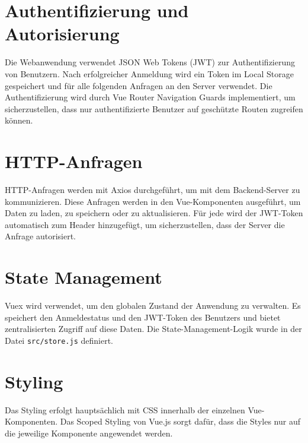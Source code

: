 \section{Authentifizierung und Autorisierung}
Die Webanwendung verwendet JSON Web Tokens (JWT) zur Authentifizierung von Benutzern. Nach erfolgreicher Anmeldung wird ein Token im Local Storage gespeichert und für alle folgenden Anfragen an den Server verwendet. Die Authentifizierung wird durch Vue Router Navigation Guards implementiert, um sicherzustellen, dass nur authentifizierte Benutzer auf geschützte Routen zugreifen können.

\section {HTTP-Anfragen}
HTTP-Anfragen werden mit Axios durchgeführt, um mit dem Backend-Server zu kommunizieren. Diese Anfragen werden in den Vue-Komponenten ausgeführt, um Daten zu laden, zu speichern oder zu aktualisieren.
Für jede wird der JWT-Token automatisch zum Header hinzugefügt, um sicherzustellen, dass der Server die Anfrage autorisiert.

\section{State Management}
Vuex wird verwendet, um den globalen Zustand der Anwendung zu verwalten. Es speichert den Anmeldestatus und den JWT-Token des Benutzers und bietet zentralisierten Zugriff auf diese Daten. Die State-Management-Logik wurde in der Datei \texttt{src/store.js} definiert.

\section{Styling}
Das Styling erfolgt hauptsächlich mit CSS innerhalb der einzelnen Vue-Komponenten. Das Scoped Styling von Vue.js sorgt dafür, dass die Styles nur auf die jeweilige Komponente angewendet werden.




